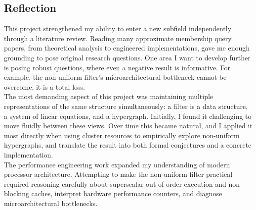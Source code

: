 \subsection{Reflection}

This project strengthened my ability to enter a new subfield independently through a literature review. Reading many approximate membership query papers, from 
theoretical analysis to engineered implementations, gave me enough grounding to pose original research questions. One area I want to develop further is posing
robust questions, where even a negative result is informative. For example, the non-uniform filter's microarchitectural bottleneck cannot be overcome, it is a 
total loss. \\

\noindent
The most demanding aspect of this project was maintaining multiple representations of the same structure simultaneously: a filter is a data structure, a system
of linear equations, and a hypergraph. Initially, I found it challenging to move fluidly between these views. Over time this became natural, and I applied it 
most directly when using cluster resources to empirically explore non-uniform hypergraphs, and translate the result into both formal conjectures and a concrete
implementation. \\

\noindent
The performance engineering work expanded my understanding of modern processor architecture. Attempting to make the non-uniform filter practical required 
reasoning carefully about superscalar out-of-order execution and non-blocking caches, interpret hardware performance counters, and diagnose microarchitectural 
bottlenecks.